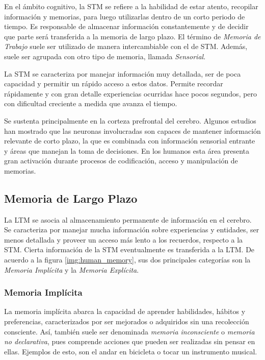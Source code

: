 En el \'ambito cognitivo, la STM se refiere a la habilidad de estar atento, recopilar informaci\'on  y memorias, para luego utilizarlas dentro de un corto periodo de tiempo. Es responsable de almacenar informaci\'on constantemente y de decidir que parte ser\'a transferida a la memoria de largo plazo. El t\'ermino de \textit{Memoria de Trabajo} suele ser utilizado de manera intercambiable con el de STM. Adem\'as, suele ser agrupada con otro tipo de memoria, llamada \textit{Sensorial}.

La STM se caracteriza por manejar informaci\'on muy detallada, ser de poca capacidad y permitir un r\'apido acceso a estos datos. Permite recordar r\'apidamente y con gran detalle experiencias ocurridas hace pocos segundos, pero con dificultad creciente a medida que avanza el tiempo.

Se sustenta principalmente en la corteza prefrontal del cerebro. Algunos estudios han mostrado que las neuronas involucradas son capaces de mantener informaci\'on relevante de corto plazo, la que es combinada con informaci\'on sensorial entrante y \'areas que manejan la toma de decisiones. %
En los humanos esta \'area presenta gran activaci\'on durante procesos de codificaci\'on, acceso y manipulaci\'on de memorias. %


\subsection{Memoria de Largo Plazo}

La LTM se asocia al almacenamiento permanente de informaci\'on en el cerebro. Se caracteriza por manejar mucha informaci\'on sobre experiencias y entidades, ser menos detallada y proveer un acceso m\'as lento a los recuerdos, respecto a la STM\cite{Eichenbaum:2008}. Cierta informaci\'on de la STM eventualmente es transferida a la LTM. De acuerdo a la figura \ref{img:human_memory}, sus dos principales categor\'ias son la \textit{Memoria Impl\'icita} y la \textit{Memoria Expl\'icita}.

\subsubsection{Memoria Impl\'icita}

La memoria impl\'icita  abarca la capacidad de aprender habilidades, h\'abitos y preferencias, caracterizados por ser mejorados o adquiridos sin una recolecci\'on consciente. As\'i, tambi\'en suele ser denominada \textit{memoria inconsciente} o \textit{memoria no declarativa}, pues comprende acciones que pueden ser realizadas sin pensar en ellas. Ejemplos de esto, son el andar en bicicleta o tocar un instrumento musical.

